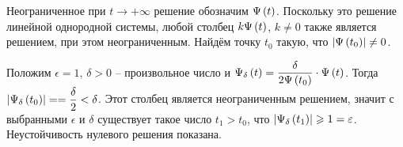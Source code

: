 \documentclass[a5paper,10pt]{article}
\begin{document}
Неограниченное при $t \to +\infty$ решение обозначим $\Psi\left(t\right)$. Поскольку это решение линейной однородной системы, любой столбец $k \Psi\left(t\right)$, $k \ne 0$ также является решением, при этом неограниченным. Найдём точку $t_{0}$ такую, что $\left|\Psi\left(t_{0}\right)\right| \ne 0$.

Положим $\epsilon = 1$, $\delta > 0$ -- произвольное число и $\Psi_{\delta}\left(t\right) =  \dfrac {\delta} {2\Psi\left(t_{0}\right)} \cdot \Psi\left(t\right)$. Тогда $\vbr{\Psi_{\delta}\br{t_{0}}} = \linebreak = \dfrac {\delta}  {2} < \delta$. Этот столбец является неограниченным решением, значит с выбранными $\epsilon$ и $\delta$ существует такое число $t_{1} > t_{0}$, что $\left|\Psi_{\delta}\left(t_{1}\right)\right| \geqslant 1 = \varepsilon$. Неустойчивость нулевого решения показана.
\end{document}
